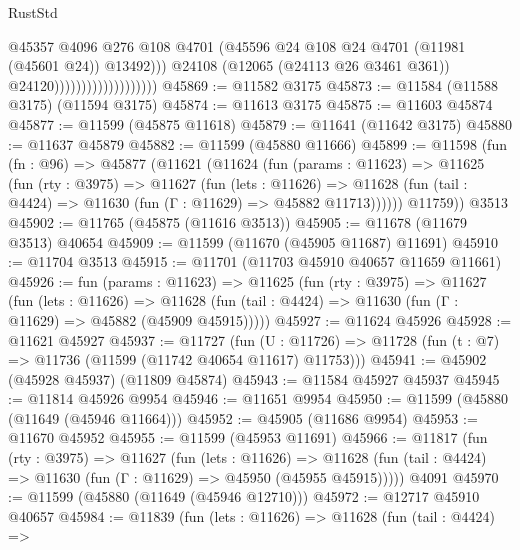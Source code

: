\begin{lexlean}{RustStd}
\begin{coremodule}
                                              @45357
                                              @4096
                                              @276
                                              @108
                                              @4701
                                              (@45596
                                                @24
                                                @108
                                                @24
                                                @4701
                                                (@11981 (@45601 @24))
                                                @13492)))
                                          @24108
                                          (@12065 (@24113 @26 @3461 @361))
                                          @24120)))))))))))))))))))
@45869 := @11582 @3175
@45873 := @11584 (@11588 @3175) (@11594 @3175)
@45874 := @11613 @3175
@45875 := @11603 @45874
@45877 := @11599 (@45875 @11618)
@45879 := @11641 (@11642 @3175)
@45880 := @11637 @45879
@45882 := @11599 (@45880 @11666)
@45899 := @11598
    (fun (fn : @96) =>
    @45877
      (@11621
        (@11624
          (fun (params : @11623) =>
          @11625
            (fun (rty : @3975) =>
            @11627
              (fun (lets : @11626) =>
              @11628 (fun (tail : @4424) => @11630 (fun (Γ : @11629) => @45882 @11713))))))
        @11759))
    @3513
@45902 := @11765 (@45875 (@11616 @3513))
@45905 := @11678 (@11679 @3513) @40654
@45909 := @11599 (@11670 (@45905 @11687) @11691)
@45910 := @11704 @3513
@45915 := @11701 (@11703 @45910 @40657 @11659 @11661)
@45926 := fun (params : @11623) =>
  @11625
    (fun (rty : @3975) =>
    @11627
      (fun (lets : @11626) =>
      @11628 (fun (tail : @4424) => @11630 (fun (Γ : @11629) => @45882 (@45909 @45915)))))
@45927 := @11624 @45926
@45928 := @11621 @45927
@45937 := @11727
    (fun (U : @11726) => @11728 (fun (t : @7) => @11736 (@11599 (@11742 @40654 @11617) @11753)))
@45941 := @45902 (@45928 @45937) (@11809 @45874)
@45943 := @11584 @45927 @45937
@45945 := @11814 @45926 @9954
@45946 := @11651 @9954
@45950 := @11599 (@45880 (@11649 (@45946 @11664)))
@45952 := @45905 (@11686 @9954)
@45953 := @11670 @45952
@45955 := @11599 (@45953 @11691)
@45966 := @11817
    (fun (rty : @3975) =>
    @11627
      (fun (lets : @11626) =>
      @11628 (fun (tail : @4424) => @11630 (fun (Γ : @11629) => @45950 (@45955 @45915)))))
    @4091
@45970 := @11599 (@45880 (@11649 (@45946 @12710)))
@45972 := @12717 @45910 @40657
@45984 := @11839
    (fun (lets : @11626) =>
    @11628
      (fun (tail : @4424) =>

\end{coremodule}
\end{lexlean}
